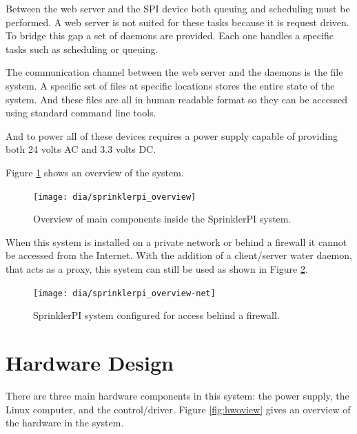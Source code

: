 \documentclass{article}
\begin{document}
Between the web server and the SPI device both queuing and scheduling
must be performed.
A web server is not suited for these tasks because it is request driven.
To bridge this gap a set of daemons are provided.
Each one handles a specific tasks such as scheduling or queuing.

The communication channel between the web server and the daemons is the
file system.
A specific set of files at specific locations stores the entire state
of the system.
And these files are all in human readable format so they
can be accessed using standard command line tools.

And to power all of these devices requires a power supply capable
of providing both 24 volts AC and 3.3 volts DC.

Figure \ref{fig:spioview} shows an overview of the system.

\begin{figure}[h!]
\begin{center}
\texttt{[image: dia/sprinklerpi\_overview]}
\end{center}
\caption{Overview of main components inside the SprinklerPI system.}
\label{fig:spioview}
\end{figure}

\pagebreak
When this system is installed on a private network or behind a firewall
it cannot be accessed from the Internet.  With the addition of a
client/server water daemon, that acts as a proxy, this system can still be
used as shown in Figure \ref{fig:spioviewnet}.

\begin{figure}[h!]
\begin{center}
\texttt{[image: dia/sprinklerpi\_overview-net]}
\end{center}
\caption{SprinklerPI system configured for access behind a firewall.}
\label{fig:spioviewnet}
\end{figure}


\clearpage
\section{Hardware Design}
\label{sec:hardware}

There are three main hardware components in this system:
the power supply, the Linux computer, and the control/driver.
Figure \ref{fig:hwoview} gives an overview of the hardware in the system.
\end{document}
